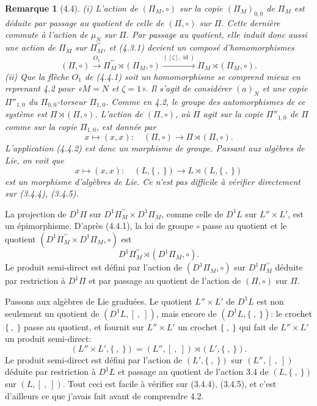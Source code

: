 \documentclass[10pt,a4paper]{article}
\newcommand{\Id}{\operatorname{id}}
\theoremstyle{deligne}
\newtheorem*{remark*}{Remarque}
\newcommand{\heading}[1]{\vspace{0.65em}\noindent{\bfseries #1}\quad}
\begin{document}
\begin{remark*}[4.4]
(i) L'action de \((\Pi_M,\circ)\) sur la copie \((\Pi_M)_{0,0}\) de \(\Pi_M\) est déduite par passage au quotient de celle de \((\Pi,\circ)\) sur \(\Pi\). Cette dernière commute à l'action de \(\mu_N\) sur \(\Pi\). Par passage au quotient, elle induit donc aussi une action de \(\Pi_M\) sur \(\Pi_M^{\prime\prime}\), et (4.3.1) devient un composé d'homomorphismes
\[
\tag{4.4.1}
(\Pi,\circ)\overset{O_1}{\longrightarrow}\Pi_M^{\prime\prime}\rtimes(\Pi_M,\circ)
\overset{([\zeta],\Id)}{\longrightarrow}\Pi_M\rtimes(\Pi_M,\circ).
\]
(ii) Que la flèche \(O_1\) de (4.4.1) soit un homomorphisme se comprend mieux en reprenant 4.2 pour «\(M=N\) et \(\zeta=1\)». Il s'agit de considérer \((a)_N\) et une copie \(\Pi''_{1,0}\) du \(\Pi_{0,0}\)-torseur \(\Pi_{1,0}\). Comme en 4.2, le groupe des automorphismes de ce système est \(\Pi\rtimes(\Pi,\circ)\). L'action de \((\Pi,\circ)\), où \(\Pi\) agit sur la copie \(\Pi''_{1,0}\) de \(\Pi\) comme sur la copie \(\Pi_{1,0}\), est donnée par
\[
\tag{4.4.2}
x\longmapsto(x,x):\quad (\Pi,\circ)\longrightarrow \Pi\rtimes(\Pi,\circ).
\]
L'application (4.4.2) est donc un morphisme de groupe. Passant aux algèbres de Lie, on voit que
\[
\tag{4.4.3}
x\longmapsto(x,x):\quad (L,\{\ ,\ \})\longrightarrow L\rtimes(L,\{\ ,\ \})
\]
est un morphisme d'algèbres de Lie. Ce n'est pas difficile à vérifier directement sur (3.4.4), (3.4.5).
\end{remark*}

\heading{4.5.} La projection de \(D^1\Pi\) sur \(D^1\Pi_M^{\prime\prime}\times D^1\Pi_M\), comme celle de \(D^1L\) sur \(L''\times L'\), est un épimorphisme. D'après (4.4.1), la loi de groupe \(\circ\) passe au quotient et le quotient \((D^1\Pi_M^{\prime\prime}\times D^1\Pi_M,\circ)\) est
\[
D^1\Pi_M^{\prime\prime}\rtimes(D^1\Pi_M,\circ).
\]
Le produit semi-direct est défini par l'action de \((D^1\Pi_M,\circ)\) sur \(D^1\Pi_M^{\prime\prime}\) déduite par restriction à \(D^1\Pi\) et par passage au quotient de l'action de \((\Pi,\circ)\) sur \(\Pi\).

Passons aux algèbres de Lie graduées. Le quotient \(L''\times L'\) de \(D^1L\) est non seulement un quotient de \((D^1L,[\ ,\ ])\), mais encore de \((D^1L,\{\ ,\ \})\): le crochet \(\{\ ,\ \}\) passe au quotient, et fournit sur \(L''\times L'\) un crochet \(\{\ ,\ \}\) qui fait de \(L''\times L'\) un produit semi-direct:
\[
(L''\times L',\{\ ,\ \})=(L'',[\ ,\ ])\rtimes(L',\{\ ,\ \}).
\]
Le produit semi-direct est défini par l'action de \((L',\{\ ,\ \})\) sur \((L'',[\ ,\ ])\) déduite par restriction à \(D^1L\) et passage au quotient de l'action 3.4 de \((L,\{\ ,\ \})\) sur \((L,[\ ,\ ])\). Tout ceci est facile à vérifier sur (3.4.4), (3.4.5), et c'est d'ailleurs ce que j'avais fait avant de comprendre 4.2.
\end{document}
